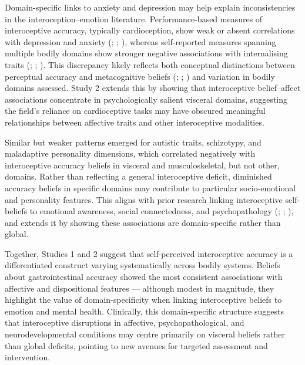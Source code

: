 \documentclass[
  jou,
  floatsintext,
  longtable,
  nolmodern,
  notxfonts,
  notimes,
  colorlinks=true,linkcolor=blue,citecolor=blue,urlcolor=blue]{apa7}
\begin{document}
Domain-specific links to anxiety and depression may help explain
inconsistencies in the interoception--emotion literature.
Performance-based measures of interoceptive accuracy, typically
cardioception, show weak or absent correlations with depression and
anxiety (;
;
),
whereas self-reported measures spanning multiple bodily domains show
stronger negative associations with internalising traits
(;
;
). This discrepancy likely
reflects both conceptual distinctions between perceptual accuracy and
metacognitive beliefs (; ; ) and variation in bodily domains assessed. Study 2
extends this by showing that interoceptive belief--affect associations
concentrate in psychologically salient visceral domains, suggesting the
field's reliance on cardioceptive tasks may have obscured meaningful
relationships between affective traits and other interoceptive
modalities.

Similar but weaker patterns emerged for autistic traits, schizotypy, and
maladaptive personality dimensions, which correlated negatively with
interoceptive accuracy beliefs in visceral and musculoskeletal, but not
other, domains. Rather than reflecting a general interoceptive deficit,
diminished accuracy beliefs in specific domains may contribute to
particular socio-emotional and personality features. This aligns with
prior research linking interoceptive self-beliefs to emotional
awareness, social connectedness, and psychopathology
(;
;
), and
extends it by showing these associations are domain-specific rather than
global.

Together, Studies 1 and 2 suggest that self-perceived interoceptive
accuracy is a differentiated construct varying systematically across
bodily systems. Beliefs about gastrointestinal accuracy showed the most
consistent associations with affective and dispositional features ---
although modest in magnitude, they highlight the value of
domain-specificity when linking interoceptive beliefs to emotion and
mental health. Clinically, this domain-specific structure suggests that
interoceptive disruptions in affective, psychopathological, and
neurodevelopmental conditions may centre primarily on visceral beliefs
rather than global deficits, pointing to new avenues for targeted
assessment and intervention.
\end{document}
